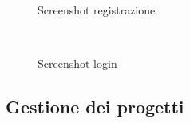 \documentclass{article}
\begin{document}
\begin{figure}[!h]
    \begin{minipage}[c]{0.5\linewidth}
        \centering
        \\
        \caption{\raggedleft Screenshot registrazione}
    \end{minipage}\hfill
    \begin{minipage}[c]{0.5\linewidth}
        \centering
        \\
        \caption{Screenshot login}
    \end{minipage}
\end{figure}

\subsection{Gestione dei progetti}
\end{document}
